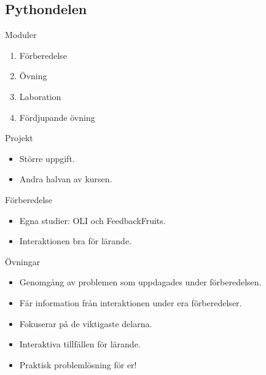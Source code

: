\subsection{Pythondelen}

\begin{frame}
  \begin{block}{Moduler}
    \begin{enumerate}
      \item Förberedelse
      \item Övning
      \item Laboration
      \item Fördjupande övning
    \end{enumerate}
  \end{block}

  \pause

  \begin{block}{Projekt}
    \begin{itemize}
      \item Större uppgift.
      \item Andra halvan av kursen.
    \end{itemize}
  \end{block}
\end{frame}

\begin{frame}
  \begin{block}{Förberedelse}
    \begin{itemize}
      \item Egna studier: OLI och FeedbackFruits.
      \item Interaktionen bra för lärande.
    \end{itemize}
  \end{block}

  \pause

  \begin{block}{Övningar}
    \begin{itemize}
      \item Genomgång av problemen som uppdagades under förberedelsen.
      \item Får information från interaktionen under era förberedelser.
      \item Fokuserar på de viktigaste delarna.
      \item Interaktiva tillfällen för lärande.
      \item Praktisk problemlösning för er!
    \end{itemize}
  \end{block}
\end{frame}

